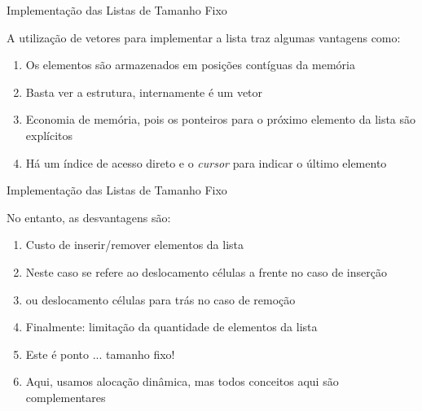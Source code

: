 \begin{frame}{Implementação das Listas de Tamanho Fixo}

A utilização de vetores para implementar a lista traz algumas vantagens como:	
  \begin{enumerate}
	\item Os elementos são armazenados em posições contíguas da memória
	\item Basta ver a estrutura, internamente é um vetor
	\item Economia de memória, pois os ponteiros para o próximo elemento da lista são explícitos
	\item Há um índice de acesso direto e o {\em cursor} para indicar o último elemento
\end{enumerate}

\end{frame}

\begin{frame}{Implementação das Listas de Tamanho Fixo}

No entanto, as desvantagens são:		
  \begin{enumerate}
\item Custo de inserir/remover elementos da lista 
\pause
\item Neste caso se refere ao deslocamento células a frente no caso de inserção
\item ou  deslocamento células para trás no caso de remoção
\item Finalmente: limitação da quantidade de elementos da lista
\item Este é ponto ... tamanho fixo!
\item Aqui, usamos alocação dinâmica, mas todos conceitos aqui são complementares
\end{enumerate}

\end{frame}

